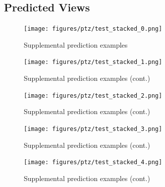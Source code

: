 \begin{appendices}
\section{Predicted Views} \label{sec:app-predictions-pred}
\begin{figure}[H]
    \centering
    \texttt{[image: figures/ptz/test\_stacked\_0.png]}
    \caption{Supplemental prediction examples}
    \label{fig:supl-predictions-pred1}
\end{figure}
\begin{figure}[H]
    \centering
    \texttt{[image: figures/ptz/test\_stacked\_1.png]}
    \caption{Supplemental prediction examples (cont.)}
    \label{fig:supl-predictions-pred2}    
\end{figure}
\begin{figure}[H]
    \centering
    \texttt{[image: figures/ptz/test\_stacked\_2.png]}
    \caption{Supplemental prediction examples (cont.)}
    \label{fig:supl-predictions-pred3}    
\end{figure}
\begin{figure}[H]
    \centering
    \texttt{[image: figures/ptz/test\_stacked\_3.png]}
    \caption{Supplemental prediction examples (cont.)}
    \label{fig:supl-predictions-pred4}    
\end{figure}
\begin{figure}[H]
    \centering
    \texttt{[image: figures/ptz/test\_stacked\_4.png]}
        \caption{Supplemental prediction examples (cont.)}
        \label{fig:supl-predictions-pred5}
\end{figure}

\end{appendices}